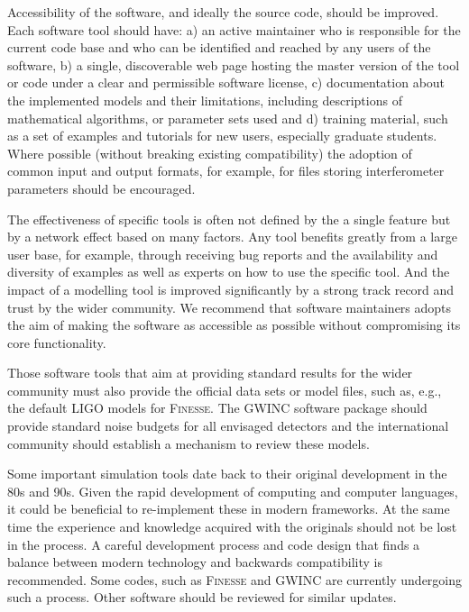 Accessibility of the software, and ideally the source code, should be improved. Each software tool should have: a) an active maintainer who is responsible for the current code base and who can be identified and reached by any users of the software, b) a single, discoverable web page hosting the master version of the tool or code under a clear and permissible software license, c) documentation about the implemented models and their limitations, including descriptions of mathematical algorithms, or parameter sets used and d) training material, such as a set of examples and tutorials for new users, especially graduate students. Where possible (without breaking existing compatibility) the adoption of common input and output formats, for example, for files storing interferometer parameters should be encouraged.

The effectiveness of specific tools is often not defined by the a single feature but by a network effect based on many factors. Any tool benefits greatly from a large user base, for example, through receiving bug reports and the availability and diversity of examples as well as experts on how to use the specific tool. And the impact of a modelling tool is improved significantly by a strong track record and trust by the wider community. We recommend that software maintainers adopts the aim of making the software as accessible as possible without compromising its core functionality. %

Those software tools that aim at providing standard results for the wider community must also provide the official data sets or model files, such as, e.g., the default LIGO models for \textsc{Finesse}. The GWINC software package should provide standard noise budgets for all envisaged detectors and the
international community should establish a mechanism to review these models.

Some important simulation tools date back to their original development in the 80s and 90s. Given the rapid development of computing and computer languages, it could be beneficial to re-implement these in modern frameworks. At the same time the experience and knowledge acquired with the originals should not be lost in the process. A careful development process and code design that finds a balance between modern technology and backwards compatibility
is recommended. Some codes, such as \textsc{Finesse} and GWINC are currently undergoing such a process. Other software should be reviewed for similar updates.

